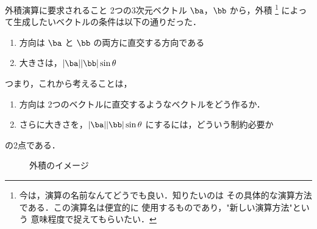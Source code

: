             \begin{mysmallsec}{外積演算に要求されること}
                2つの3次元ベクトル $\ba$，$\bb$ から，外積
                    \footnote{
                        今は，演算の名前なんてどうでも良い．知りたいのは
                        その具体的な演算方法である．この演算名は便宜的に
                        使用するものであり，"新しい演算方法"という
                        意味程度で捉えてもらいたい．
                    }
                によって生成したいベクトルの条件は以下の通りだった．
                \begin{enumerate}
                    \item 方向は $\ba$ と $\bb$ の両方に直交する方向である
                    \item 大きさは，$|\ba||\bb| \sin \theta$
                \end{enumerate}

                つまり，これから考えることは，
                \begin{enumerate}
                    \item 方向は 2つのベクトルに直交するようなベクトルをどう作るか．
                    \item さらに大きさを，$|\ba||\bb| \sin \theta$ にするには，どういう制約必要か
                \end{enumerate}
                の2点である．
                    \begin{figure}[hbt]
                        \begin{center}
                            \caption{外積のイメージ}
                            \label{fig:gaiseki_01}
                        \end{center}
                    \end{figure}
            \end{mysmallsec}

